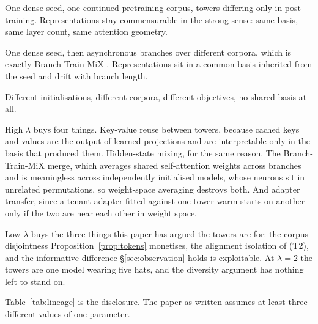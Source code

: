 \documentclass[11pt]{article}
\begin{document}
\begin{description}[itemsep=3pt,leftmargin=1.4em]
\item[$\lambda = 2$, shared corpus.] One dense seed, one continued-pretraining corpus, towers differing only in post-training. Representations stay commensurable in the strong sense: same basis, same layer count, same attention geometry.
\item[$\lambda = 1$, divergent branches.] One dense seed, then asynchronous branches over different corpora, which is exactly Branch-Train-MiX \cite{sukhbaatar2024btx}. Representations sit in a common basis inherited from the seed and drift with branch length.
\item[$\lambda = 0$, independent.] Different initialisations, different corpora, different objectives, no shared basis at all.
\end{description}

High $\lambda$ buys four things. Key-value reuse between towers, because cached keys and values are the output of learned projections and are interpretable only in the basis that produced them. Hidden-state mixing, for the same reason. The Branch-Train-MiX merge, which averages shared self-attention weights across branches \cite{sukhbaatar2024btx} and is meaningless across independently initialised models, whose neurons sit in unrelated permutations, so weight-space averaging destroys both. And adapter transfer, since a tenant adapter fitted against one tower warm-starts on another only if the two are near each other in weight space.

Low $\lambda$ buys the three things this paper has argued the towers are for: the corpus disjointness Proposition~\ref{prop:tokens} monetises, the alignment isolation of (T2), and the informative difference \S\ref{sec:observation} holds is exploitable. At $\lambda = 2$ the towers are one model wearing five hats, and the diversity argument has nothing left to stand on.

Table~\ref{tab:lineage} is the disclosure. The paper as written assumes at least three different values of one parameter.
\end{document}
